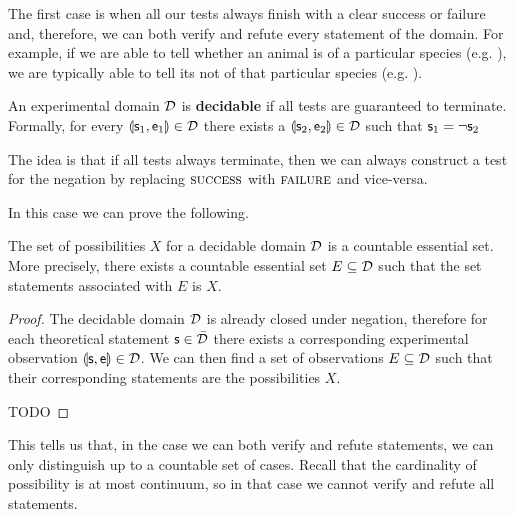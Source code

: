 \documentclass[11pt,letterpaper,fleqn]{memoir} %
\begin{document}
The first case is when all our tests always finish with a clear success or failure and, therefore, we can both verify and refute every statement of the domain. For example, if we are able to tell whether an animal is of a particular species (e.g. ), we are typically able to tell its not of that particular species (e.g. ).

\begin{mathSection}
	
	\begin{defn}
		An experimental domain $\mathcal{D}$ is \textbf{decidable} if all tests are guaranteed to terminate. Formally, for every $\llparenthesis \mathsf{s}_1, \mathsf{e}_1 \rrparenthesis \in \mathcal{D}$ there exists a $\llparenthesis \mathsf{s}_2, \mathsf{e}_2 \rrparenthesis \in \mathcal{D}$ such that $\mathsf{s}_1 = \neg \mathsf{s}_2$
	\end{defn}
	
	\begin{justification}
		The idea is that if all tests always terminate, then we can always construct a test for the negation by replacing $\textsc{success}$ with $\textsc{failure}$ and vice-versa.
	\end{justification}
	
\end{mathSection}

In this case we can prove the following.

\begin{mathSection}
	
	\begin{prop}
		The set of possibilities $X$ for a decidable domain $\mathcal{D}$ is a countable essential set. More precisely, there exists a countable essential set $E \subseteq \mathcal{D}$ such that the set statements associated with $E$ is $X$.
	\end{prop}
	
	\begin{proof}
		The decidable domain $\mathcal{D}$ is already closed under negation, therefore for each theoretical statement $\mathsf{s} \in \bar{\mathcal{D}}$ there exists a corresponding experimental observation $\llparenthesis \mathsf{s}, \mathsf{e} \rrparenthesis \in \mathcal{D}$. We can then find a set of observations $E\subseteq \mathcal{D}$ such that their corresponding statements are the possibilities $X$.
		
		TODO
	\end{proof}
	
\end{mathSection}

This tells us that, in the case we can both verify and refute statements, we can only distinguish up to a countable set of cases. Recall that the cardinality of possibility is at most continuum, so in that case we cannot verify and refute all statements.
\end{document}
